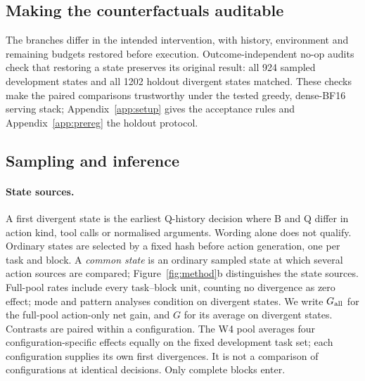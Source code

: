 \newcommand{\gateQQ}{20/20}%
\newcommand{\gateBB}{10/10}%
\newcommand{\noopdev}{924/924}%
\newcommand{\noopfrac}{10\%}%
\newcommand{\minblk}{10}%


\subsection{Making the counterfactuals auditable}
\label{sec:replay}

The branches differ in the intended intervention, with history, environment and remaining budgets restored before execution. Outcome-independent no-op audits check that restoring a state preserves its original result: all 924 sampled development states and all 1202 holdout divergent states matched. These checks make the paired comparisons trustworthy under the tested greedy, dense-BF16 serving stack; Appendix~\ref{app:setup} gives the acceptance rules and Appendix~\ref{app:prereg} the holdout protocol.

\subsection{Sampling and inference}
\label{sec:states}

\paragraph{State sources.} A first divergent state is the earliest Q-history decision where B and Q differ in action kind, tool calls or normalised arguments. Wording alone does not qualify. Ordinary states are selected by a fixed hash before action generation, one per task and block. A \emph{common state} is an ordinary sampled state at which several action sources are compared; Figure~\ref{fig:method}b distinguishes the state sources. Full-pool rates include every task--block unit, counting no divergence as zero effect; mode and pattern analyses condition on divergent states. We write $G_{\mathrm{all}}$ for the full-pool action-only net gain, and $G$ for its average on divergent states. %
Contrasts are paired within a configuration. The W4 pool averages four configuration-specific effects equally on the fixed development task set; each configuration supplies its own first divergences. It is not a comparison of configurations at identical decisions. Only complete blocks enter. %


